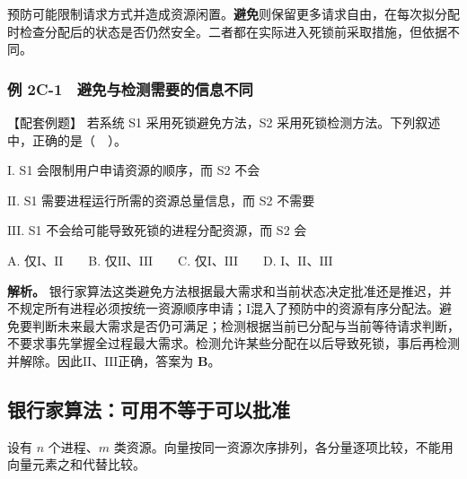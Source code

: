 预防可能限制请求方式并造成资源闲置。\textbf{避免}则保留更多请求自由，在每次拟分配时检查分配后的状态是否仍然安全。二者都在实际进入死锁前采取措施，但依据不同。

\subsubsection{例 2C-1　避免与检测需要的信息不同}\label{OS02-ex4-1}

\begin{example}[配套例题]

【配套例题】 若系统 S1 采用死锁避免方法，S2 采用死锁检测方法。下列叙述中，正确的是（　）。

\ensuremath{\mathrm{I}}. S1 会限制用户申请资源的顺序，而 S2 不会

\ensuremath{\mathrm{II}}. S1 需要进程运行所需的资源总量信息，而 S2 不需要

\ensuremath{\mathrm{III}}. S1 不会给可能导致死锁的进程分配资源，而 S2 会

A. 仅\ensuremath{\mathrm{I}}、\ensuremath{\mathrm{II}}　　B. 仅\ensuremath{\mathrm{II}}、\ensuremath{\mathrm{III}}　　C. 仅\ensuremath{\mathrm{I}}、\ensuremath{\mathrm{III}}　　D. \ensuremath{\mathrm{I}}、\ensuremath{\mathrm{II}}、\ensuremath{\mathrm{III}}

\end{example}

\textbf{解析。} 银行家算法这类避免方法根据最大需求和当前状态决定批准还是推迟，并不规定所有进程必须按统一资源顺序申请；\ensuremath{\mathrm{I}}混入了预防中的资源有序分配法。避免要判断未来最大需求是否仍可满足；检测根据当前已分配与当前等待请求判断，不要求事先掌握全过程最大需求。检测允许某些分配在以后导致死锁，事后再检测并解除。因此\ensuremath{\mathrm{II}}、\ensuremath{\mathrm{III}}正确，答案为 \textbf{B}。

\subsection{银行家算法：可用不等于可以批准}\label{OS02-4-3}

设有 \(n\) 个进程、\(m\) 类资源。向量按同一资源次序排列，各分量逐项比较，不能用向量元素之和代替比较。


